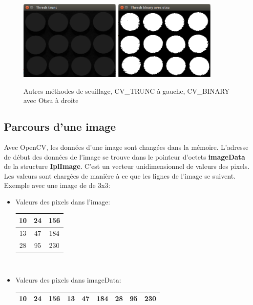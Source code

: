 \begin{figure}[H]
      \center
      \includegraphics[width=5cm]{ressources/tp3/thresh_trunc.png}
      \includegraphics[width=5cm]{ressources/tp3/thresh_otsu.png}
      \caption{Autres méthodes de seuillage, CV\_TRUNC à gauche, CV\_BINARY avec Otsu à droite}
\end{figure}


\subsection{Parcours d'une image}

Avec OpenCV, les données d'une image sont changées dans la mémoire. L'adresse de début des données de l'image se trouve dans le 
pointeur d'octets \textbf{imageData} de la structure \textbf{IplImage}. C'est un vecteur unidimensionnel de valeurs des pixels. 
Les valeurs sont chargées de manière à ce que les lignes de l'image se suivent.\\

Exemple avec une image de de 3x3:\\

\begin{itemize}

  \item Valeurs des pixels dans l'image:
  \begin{tabular}{|c|c|c|}
    \hline
    10 & 24 & 156 \\
    \hline
    13 & 47 & 184 \\
    \hline
    28 & 95 & 230 \\
    \hline
  \end{tabular}\\
  
  \item Valeurs des pixels dans imageData:
  \begin{tabular}{|c|c|c|c|c|c|c|c|c|}
    \hline
    10 & 24 & 156 & 13 & 47 & 184 & 28 & 95 & 230 \\
    \hline
  \end{tabular}\\
 
\end{itemize}

